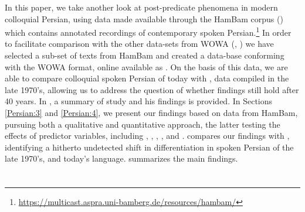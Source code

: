 \documentclass[output=paper,colorlinks,citecolor=brown,draftmode]{langscibook}
\begin{document}
In this paper, we take another look at post-predicate phenomena in modern colloquial Persian, using data made available through the HamBam corpus (\citealt{HaigRasekhMahand2022HamBam}) which contains annotated recordings of contemporary spoken Persian.\footnote{\url{https://multicast.aspra.uni-bamberg.de/resources/hambam/}} In order to facilitate comparison with the other data-sets from WOWA (, ) we have selected a sub-set of texts from HamBam and created a data-base conforming with the WOWA format, online available as \citet{Izadi2022Persian}. On the basis of this data, we are able to compare colloquial spoken Persian of today with , data compiled in the late 1970's, allowing us to address the question of whether  findings still hold after 40 years. In , a summary of  study and his findings is provided. In Sections \ref{Persian:3} and \ref{Persian:4}, we present our findings based on data from HamBam, pursuing both a qualitative and quantitative approach, the latter testing the effects of predictor variables, including , , , , and .  compares our findings with , identifying a hitherto undetected shift in  differentiation in spoken Persian of the late 1970's, and today's language.  summarizes the main findings.

\section{\citet{frommer_post-verbal_1981}}\label{Persian:2}
\end{document}
